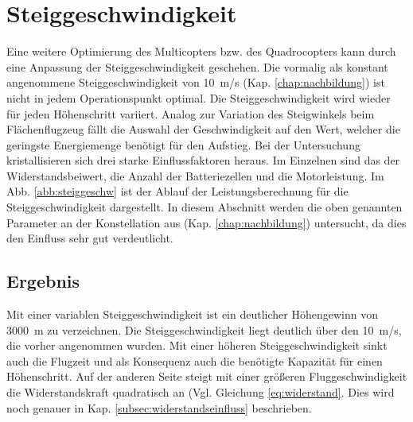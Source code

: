 

\section{Steiggeschwindigkeit}
\label{sec:steiggeschwindigkeit}
Eine weitere Optimierung des Multicopters bzw. des Quadrocopters kann durch eine Anpassung der Steiggeschwindigkeit geschehen. Die vormalig als konstant angenommene Steiggeschwindigkeit von \SI{10}{m/s} (Kap. \ref{chap:nachbildung}) ist nicht in jedem Operationspunkt optimal. Die Steiggeschwindigkeit wird wieder für jeden Höhenschritt variiert. Analog zur Variation des Steigwinkels beim Flächenflugzeug fällt die Auswahl der Geschwindigkeit auf den Wert, welcher die geringste Energiemenge benötigt für den Aufstieg. Bei der Untersuchung kristallisieren sich drei starke Einflussfaktoren heraus. Im Einzelnen sind das der Widerstandsbeiwert, die Anzahl der Batteriezellen und die Motorleistung. Im Abb. \ref{abb:steiggeschw} ist der Ablauf der Leistungsberechnung für die Steiggeschwindigkeit dargestellt. In diesem Abschnitt werden die oben genannten Parameter an der Konstellation aus (Kap. \ref{chap:nachbildung}) untersucht, da dies den Einfluss sehr gut verdeutlicht.


\subsection{Ergebnis}
Mit einer variablen Steiggeschwindigkeit ist ein deutlicher Höhengewinn von \SI{3000}{m} zu verzeichnen. Die Steiggeschwindigkeit liegt deutlich über den \SI{10}{m/s}, die vorher angenommen wurden. Mit einer höheren Steiggeschwindigkeit sinkt auch die Flugzeit und als Konsequenz auch die benötigte Kapazität für einen Höhenschritt. Auf der anderen Seite steigt mit einer größeren Fluggeschwindigkeit die Widerstandskraft quadratisch an (Vgl. Gleichung \ref{eq:widerstand}. Dies wird noch genauer in Kap. \ref{subsec:widerstandseinfluss} beschrieben. 

